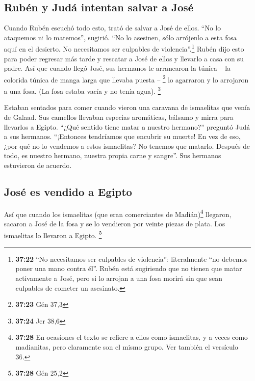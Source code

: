 \hypertarget{rubuxe9n-y-juduxe1-intentan-salvar-a-josuxe9}{%
\subsection{Rubén y Judá intentan salvar a
José}\label{rubuxe9n-y-juduxe1-intentan-salvar-a-josuxe9}}

 Cuando Rubén escuchó todo esto, trató de salvar a José
de ellos.  ``No lo ataquemos ni lo matemos'', sugirió.
``No lo asesinen, sólo arrójenlo a esta fosa aquí en el desierto. No
necesitamos ser culpables de violencia''.\footnote{\textbf{37:22} ``No
  necesitamos ser culpables de violencia'': literalmente ``no debemos
  poner una mano contra él''. Rubén está sugiriendo que no tienen que
  matar activamente a José, pero si lo arrojan a una fosa morirá sin que
  sean culpables de cometer un asesinato.} Rubén dijo esto para poder
regresar más tarde y rescatar a José de ellos y llevarlo a casa con su
padre.  Así que cuando llegó José, sus hermanos le
arrancaron la túnica -- la colorida túnica de manga larga que llevaba
puesta -- \footnote{\textbf{37:23} Gén 37,3}  lo
agarraron y lo arrojaron a una fosa. (La fosa estaba vacía y no tenía
agua). \footnote{\textbf{37:24} Jer 38,6}

 Estaban sentados para comer cuando vieron una caravana
de ismaelitas que venía de Galaad. Sus camellos llevaban especias
aromáticas, bálsamo y mirra para llevarlos a Egipto. 
``¿Qué sentido tiene matar a nuestro hermano?'' preguntó Judá a sus
hermanos. ``¡Entonces tendríamos que encubrir su muerte! 
En vez de eso, ¿por qué no lo vendemos a estos ismaelitas? No tenemos
que matarlo. Después de todo, es nuestro hermano, nuestra propia carne y
sangre''. Sus hermanos estuvieron de acuerdo.

\hypertarget{josuxe9-es-vendido-a-egipto}{%
\subsection{José es vendido a
Egipto}\label{josuxe9-es-vendido-a-egipto}}

 Así que cuando los ismaelitas (que eran comerciantes de
Madián)\footnote{\textbf{37:28} En ocasiones el texto se refiere a ellos
  como ismaelitas, y a veces como madianitas, pero claramente son el
  mismo grupo. Ver también el versículo 36.} llegaron, sacaron a José de
la fosa y se lo vendieron por veinte piezas de plata. Los ismaelitas lo
llevaron a Egipto. \footnote{\textbf{37:28} Gén 25,2}

